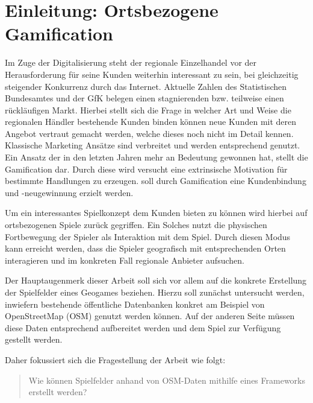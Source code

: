 \chapter{Einleitung: Ortsbezogene Gamification}
\label{ch1:Einleitung}

Im Zuge der Digitalisierung steht der regionale Einzelhandel vor der Herausforderung für seine Kunden weiterhin interessant zu sein, bei gleichzeitig steigender Konkurrenz durch das Internet. Aktuelle Zahlen des Statistischen Bundesamtes \citep{DWN.2012} und der GfK belegen einen stagnierenden bzw. teilweise einen rückläufigen Markt.
Hierbei stellt sich die Frage in welcher Art und Weise die regionalen Händler bestehende Kunden binden können neue Kunden mit deren Angebot vertraut gemacht werden, welche dieses noch nicht im Detail kennen.
Klassische Marketing Ansätze sind verbreitet und werden entsprechend genutzt.
Ein Ansatz der in den letzten Jahren mehr an Bedeutung gewonnen hat, stellt die Gamification dar. Durch diese wird versucht eine extrinsische Motivation für bestimmte Handlungen zu erzeugen. soll durch Gamification eine Kundenbindung und -neugewinnung erzielt werden.

Um ein interessantes Spielkonzept dem Kunden bieten zu können wird hierbei auf ortsbezogenen Spiele zurück gegriffen.
Ein Solches nutzt die physischen Fortbewegung der Spieler als Interaktion mit dem Spiel.
Durch diesen Modus kann erreicht werden, dass die Spieler geografisch mit entsprechenden Orten interagieren und im konkreten Fall regionale Anbieter aufsuchen.

Der Hauptaugenmerk dieser Arbeit soll sich vor allem auf die konkrete Erstellung der Spielfelder eines Geogames beziehen. Hierzu soll zunächst untersucht werden, inwiefern bestehende öffentliche Datenbanken konkret am Beispiel von OpenStreetMap (OSM) genutzt werden können. Auf der anderen Seite müssen diese Daten entsprechend aufbereitet werden und dem Spiel zur Verfügung gestellt werden.

Daher fokussiert sich die Fragestellung der Arbeit wie folgt:
\begin{quote}
\item Wie können Spielfelder anhand von OSM-Daten mithilfe eines Frameworks erstellt werden?
\end{quote}
\vspace{1cm}


